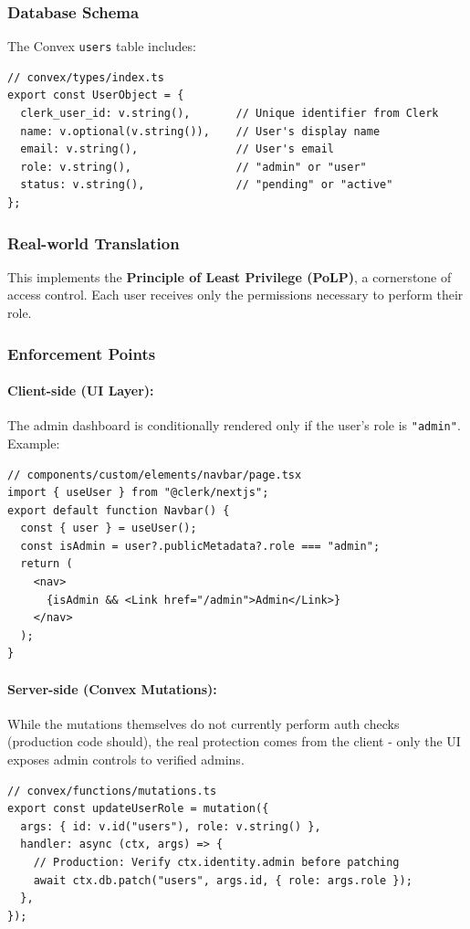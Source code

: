 \documentclass[11pt,a4paper]{article}
\begin{document}
\subsubsection{Database Schema}
The Convex \texttt{users} table includes:
\begin{lstlisting}
// convex/types/index.ts
export const UserObject = {
  clerk_user_id: v.string(),       // Unique identifier from Clerk
  name: v.optional(v.string()),    // User's display name
  email: v.string(),               // User's email
  role: v.string(),                // "admin" or "user"
  status: v.string(),              // "pending" or "active"
};
\end{lstlisting}

\subsubsection{Real-world Translation}
This implements the \textbf{Principle of Least Privilege (PoLP)}, a cornerstone of access control. Each user receives only the permissions necessary to perform their role.

\subsubsection{Enforcement Points}

\paragraph{Client-side (UI Layer):}
The admin dashboard is conditionally rendered only if the user's role is \texttt{"admin"}. Example:
\begin{lstlisting}
// components/custom/elements/navbar/page.tsx
import { useUser } from "@clerk/nextjs";
export default function Navbar() {
  const { user } = useUser();
  const isAdmin = user?.publicMetadata?.role === "admin";
  return (
    <nav>
      {isAdmin && <Link href="/admin">Admin</Link>}
    </nav>
  );
}
\end{lstlisting}

\paragraph{Server-side (Convex Mutations):}
While the mutations themselves do not currently perform auth checks (production code should), the real protection comes from the client - only the UI exposes admin controls to verified admins.
\begin{lstlisting}
// convex/functions/mutations.ts
export const updateUserRole = mutation({
  args: { id: v.id("users"), role: v.string() },
  handler: async (ctx, args) => {
    // Production: Verify ctx.identity.admin before patching
    await ctx.db.patch("users", args.id, { role: args.role });
  },
});
\end{lstlisting}
\end{document}
